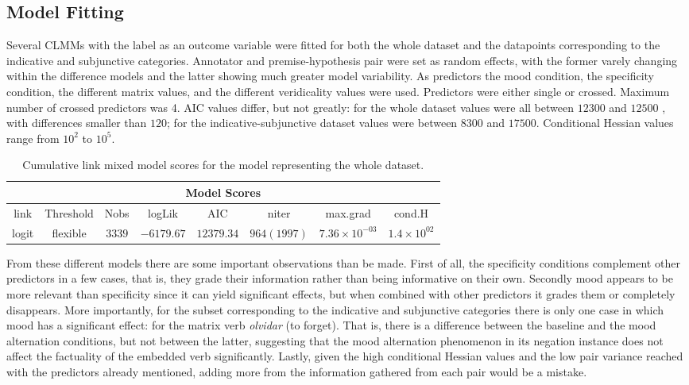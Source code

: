 \subsection{Model Fitting}\label{subsect:mod}
Several CLMMs with the label as an outcome variable were fitted for both the whole dataset and the datapoints corresponding to the indicative and subjunctive categories. Annotator and premise-hypothesis pair were set as random effects, with the former varely changing within the difference models and the latter showing much greater model variability. As predictors the mood condition, the specificity condition, the different matrix values, and the different veridicality values were used. Predictors were either single or crossed. Maximum number of crossed predictors was 4. AIC values differ, but not greatly: for the whole dataset values were all between $12300$ and $12500$ , with differences smaller than $120$; for the indicative-subjunctive dataset values were between $8300$ and $17500$. Conditional Hessian values range from $10^{2}$ to $10^{5}$.\\

\begin{table}
\center
\begin{tabular}{|c|c|c|c|c|c|c|c|}
\hline
\multicolumn{8}{|c|}{Model Scores}\\\hline
link  &  Threshold & Nobs & logLik & AIC & niter & max.grad & cond.H\\\hline
logit & flexible & $3339$ & $-6179.67$ & $12379.34$ & $964(1997)$ & $7.36\times10^{-03}$ &$1.4\times10^{02}$\\\hline
\end{tabular}
\caption[Model Scores.]{Cumulative link mixed model scores for the model representing the whole dataset.}
\label{tab:modscores}
\end{table}

From these different models there are some important observations than be made. First of all, the specificity conditions complement other predictors in a few cases, that is, they grade their information rather than being informative on their own. Secondly mood appears to be more relevant than specificity since it can yield significant effects, but when combined with other predictors it grades them or completely disappears. More importantly, for the subset corresponding to the indicative and subjunctive categories there is only one case in which mood has a significant effect: for the matrix verb \textit{olvidar} (to forget). That is, there is a difference between the baseline and the mood alternation conditions, but not between the latter, suggesting that the mood alternation phenomenon in its negation instance does not affect the factuality of the embedded verb significantly. Lastly, given the high conditional Hessian values and the low pair variance reached with the predictors already mentioned, adding more from the information gathered from each pair would be a mistake.\\


